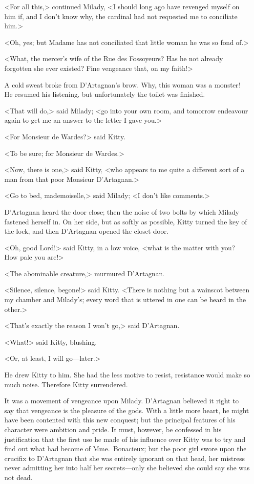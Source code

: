 <For all this,> continued Milady, <I should long ago have revenged myself on him if, and I don't know why, the cardinal had not requested me to conciliate him.> 

<Oh, yes; but Madame has not conciliated that little woman he was so fond of.> 

<What, the mercer's wife of the Rue des Fossoyeurs? Has he not already forgotten she ever existed? Fine vengeance that, on my faith!> 

A cold sweat broke from D'Artagnan's brow. Why, this woman was a monster! He resumed his listening, but unfortunately the toilet was finished. 

<That will do,> said Milady; <go into your own room, and tomorrow endeavour again to get me an answer to the letter I gave you.> 

<For Monsieur de Wardes?> said Kitty. 

<To be sure; for Monsieur de Wardes.> 

<Now, there is one,> said Kitty, <who appears to me quite a different sort of a man from that poor Monsieur D'Artagnan.> 

<Go to bed, mademoiselle,> said Milady; <I don't like comments.> 

D'Artagnan heard the door close; then the noise of two bolts by which Milady fastened herself in. On her side, but as softly as possible, Kitty turned the key of the lock, and then D'Artagnan opened the closet door. 

<Oh, good Lord!> said Kitty, in a low voice, <what is the matter with you? How pale you are!> 

<The abominable creature,> murmured D'Artagnan. 

<Silence, silence, begone!> said Kitty. <There is nothing but a wainscot between my chamber and Milady's; every word that is uttered in one can be heard in the other.> 

<That's exactly the reason I won't go,> said D'Artagnan. 

<What!> said Kitty, blushing. 

<Or, at least, I will go—later.> 

He drew Kitty to him. She had the less motive to resist, resistance would make so much noise. Therefore Kitty surrendered. 

It was a movement of vengeance upon Milady. D'Artagnan believed it right to say that vengeance is the pleasure of the gods. With a little more heart, he might have been contented with this new conquest; but the principal features of his character were ambition and pride. It must, however, be confessed in his justification that the first use he made of his influence over Kitty was to try and find out what had become of Mme.~Bonacieux; but the poor girl swore upon the crucifix to D'Artagnan that she was entirely ignorant on that head, her mistress never admitting her into half her secrets—only she believed she could say she was not dead. 

